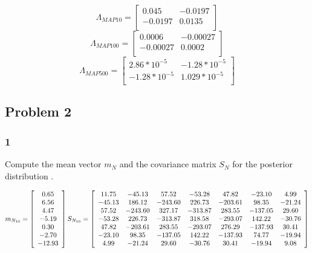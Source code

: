 \documentclass{article}
\begin{document}
\[\Lambda_{MAP10}=\begin{bmatrix}
    0.045       & -0.0197   \\
    -0.0197       & 0.0135    \\
\end{bmatrix}\]
\[\Lambda_{MAP100}=\begin{bmatrix}
    0.0006      & -0.00027   \\
    -0.00027       & 0.0002    \\
\end{bmatrix}\]
\[\Lambda_{MAP500}=\begin{bmatrix}
    2.86 * 10^{-5}       & -1.28 *10^{-5}   \\
    -1.28 *  10^{-5}      & 1.029 * 10^{-5}    \\
\end{bmatrix}\]

\clearpage %
\subsection*{Problem 2}
\subsubsection*{1}Compute the mean vector $m_{N}$ and the covariance matrix $S_{N}$ for the posterior distribution .

\[
m_{N_{10}}= \left[\begin{array}{*{1}c}
0.65 \\
6.56 \\
4.47 \\
-5.19 \\
0.30 \\
-2.70 \\
-12.93 \\
\end{array}\right]
S_{N_{10}}= \left[\begin{array}{*{7}c}
11.75 & -45.13 & 57.52 & -53.28 & 47.82 & -23.10 & 4.99 \\
-45.13 & 186.12 & -243.60 & 226.73 & -203.61 & 98.35 & -21.24 \\
57.52 & -243.60 & 327.17 & -313.87 & 283.55 & -137.05 & 29.60 \\
-53.28 & 226.73 & -313.87 & 318.58 & -293.07 & 142.22 & -30.76 \\
47.82 & -203.61 & 283.55 & -293.07 & 276.29 & -137.93 & 30.41 \\
-23.10 & 98.35 & -137.05 & 142.22 & -137.93 & 74.77 & -19.94 \\
4.99 & -21.24 & 29.60 & -30.76 & 30.41 & -19.94 & 9.08 \\
\end{array}\right]
\]
\end{document}
